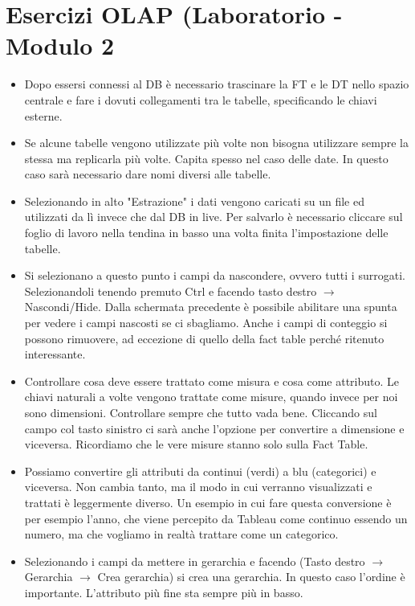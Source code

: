\section{Esercizi OLAP (Laboratorio - Modulo 2}
\begin{itemize}
	\item Dopo essersi connessi al DB è necessario trascinare la FT e le DT nello spazio centrale e fare i dovuti collegamenti tra le tabelle, specificando le chiavi esterne.
	\item Se alcune tabelle vengono utilizzate più volte non bisogna utilizzare sempre la stessa ma replicarla più volte. Capita spesso nel caso delle date. In questo caso sarà necessario dare nomi diversi alle tabelle.
	\item Selezionando in alto "Estrazione" i dati vengono caricati su un file ed utilizzati da lì invece che dal DB in live. Per salvarlo è necessario cliccare sul foglio di lavoro nella tendina in basso una volta finita l'impostazione delle tabelle.
	\item Si selezionano a questo punto i campi da nascondere, ovvero tutti i surrogati. Selezionandoli tenendo premuto Ctrl e facendo tasto destro $\xrightarrow{}$ Nascondi/Hide. Dalla schermata precedente è possibile abilitare una spunta per vedere i campi nascosti se ci sbagliamo. Anche i campi di conteggio si possono rimuovere, ad eccezione di quello della fact table perché ritenuto interessante.
	\item Controllare cosa deve essere trattato come misura e cosa come attributo. Le chiavi naturali a volte vengono trattate come misure, quando invece per noi sono dimensioni. Controllare sempre che tutto vada bene. Cliccando sul campo col tasto sinistro ci sarà anche l'opzione per convertire a dimensione e viceversa. Ricordiamo che le vere misure stanno solo sulla Fact Table.
	\item Possiamo convertire gli attributi da continui (verdi) a blu (categorici) e viceversa. Non cambia tanto, ma il modo in cui verranno visualizzati e trattati è leggermente diverso. Un esempio in cui fare questa conversione è per esempio l'anno, che viene percepito da Tableau come continuo essendo un numero, ma che vogliamo in realtà trattare come un categorico.
	\item Selezionando i campi da mettere in gerarchia e facendo (Tasto destro $\xrightarrow{}$ Gerarchia $\xrightarrow{}$ Crea gerarchia) si crea una gerarchia. In questo caso l'ordine è importante. L'attributo più fine sta sempre più in basso.

\end{itemize}
